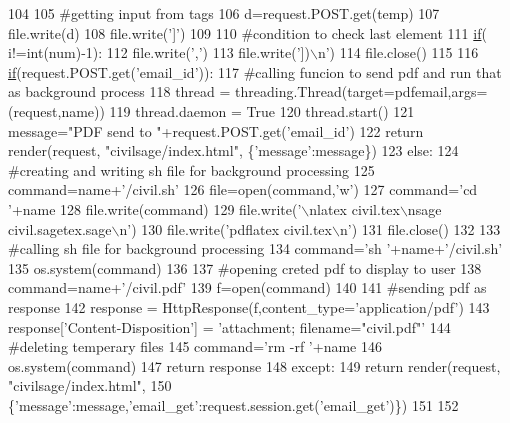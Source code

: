 \begin{DoxyCode}
104 
105                 \textcolor{comment}{#getting input from tags}
106                 d=request.POST.get(temp)
107                 file.write(d)
108                 file.write(\textcolor{stringliteral}{']'})
109 
110                 \textcolor{comment}{#condition to check last element}
111                 \hyperlink{a00029_ac2d69f5011896c6ed4a54e0dd36f6334}{if}( i!=int(num)-1):
112                     file.write(\textcolor{stringliteral}{','})
113             file.write(\textcolor{stringliteral}{'])\(\backslash\)n'})
114         file.close()
115 
116         \hyperlink{a00029_ac2d69f5011896c6ed4a54e0dd36f6334}{if}(request.POST.get(\textcolor{stringliteral}{'email\_id'})):
117             \textcolor{comment}{#calling funcion to send pdf and run that as background process}
118             thread = threading.Thread(target=pdfemail,args=(request,name))
119             thread.daemon = \textcolor{keyword}{True}
120             thread.start()
121             message=\textcolor{stringliteral}{"PDF send to "}+request.POST.get(\textcolor{stringliteral}{'email\_id'})
122             \textcolor{keywordflow}{return} render(request, \textcolor{stringliteral}{"civilsage/index.html"}, \{\textcolor{stringliteral}{'message'}:message\})
123         \textcolor{keywordflow}{else}:
124             \textcolor{comment}{#creating and writing sh file for background processing}
125             command=name+\textcolor{stringliteral}{'/civil.sh'}
126             file=open(command,\textcolor{stringliteral}{'w'})
127             command=\textcolor{stringliteral}{'cd '}+name
128             file.write(command)
129             file.write(\textcolor{stringliteral}{'\(\backslash\)nlatex civil.tex\(\backslash\)nsage civil.sagetex.sage\(\backslash\)n'})
130             file.write(\textcolor{stringliteral}{'pdflatex civil.tex\(\backslash\)n'})
131             file.close()
132 
133             \textcolor{comment}{#calling sh file for background processing}
134             command=\textcolor{stringliteral}{'sh '}+name+\textcolor{stringliteral}{'/civil.sh'}
135             os.system(command)
136 
137             \textcolor{comment}{#opening creted pdf to display to user}
138             command=name+\textcolor{stringliteral}{'/civil.pdf'}
139             f=open(command)
140 
141             \textcolor{comment}{#sending pdf as response}
142             response = HttpResponse(f,content\_type=\textcolor{stringliteral}{'application/pdf'})
143             response[\textcolor{stringliteral}{'Content-Disposition'}] = \textcolor{stringliteral}{'attachment; filename="civil.pdf"'}
144             \textcolor{comment}{#deleting temperary files}
145             command=\textcolor{stringliteral}{'rm -rf '}+name
146             os.system(command)
147             \textcolor{keywordflow}{return} response
148     \textcolor{keywordflow}{except}:
149         \textcolor{keywordflow}{return} render(request, \textcolor{stringliteral}{"civilsage/index.html"},
150         \{\textcolor{stringliteral}{'message'}:message,\textcolor{stringliteral}{'email\_get'}:request.session.get(\textcolor{stringliteral}{'email\_get'})\})
151 
152 
\end{DoxyCode}


